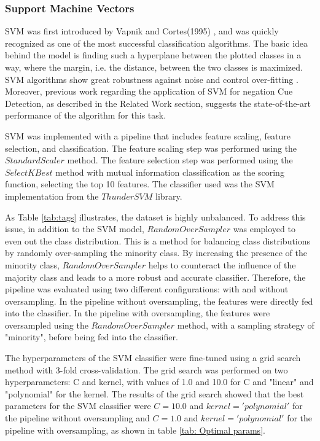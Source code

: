 
\subsubsection{Support Machine Vectors}
 SVM was first introduced by Vapnik and Cortes(1995) \cite{vapnik1995}, and was quickly recognized as one of the most successful classification algorithms. The basic idea behind the model is finding such a hyperplane between the plotted classes in a way, where the margin, i.e. the distance, between the two classes is maximized. SVM algorithms show great robustness against noise and control over-fitting \cite{robust2009}. Moreover, previous work regarding the application of SVM for negation Cue Detection, as described in the Related Work section, suggests the state-of-the-art performance of the algorithm for this task. 

SVM was implemented with a pipeline that includes feature scaling, feature selection, and classification. The feature scaling step was performed using the $StandardScaler$ method. The feature selection step was performed using the $SelectKBest$ method with mutual information classification as the scoring function, selecting the top 10 features. The classifier used was the SVM implementation from the $ThunderSVM$ library\cite{thundersvm}.

As Table \ref{tab:tags} illustrates, the dataset is highly unbalanced. To address this issue, in addition to the SVM model, $RandomOverSampler$ was employed to even out the class distribution. This is a method for balancing class distributions by randomly over-sampling the minority class. By increasing the presence of the minority class, $RandomOverSampler$ helps to counteract the influence of the majority class and leads to a more robust and accurate classifier. Therefore, the pipeline was evaluated using two different configurations: with and without oversampling. In the pipeline without oversampling, the features were directly fed into the classifier. In the pipeline with oversampling, the features were oversampled using the $RandomOverSampler$ method, with a sampling strategy of "minority", before being fed into the classifier.

The hyperparameters of the SVM classifier were fine-tuned using a grid search method with 3-fold cross-validation. The grid search was performed on two hyperparameters: C and kernel, with values of 1.0 and 10.0 for C and "linear" and "polynomial" for the kernel. The results of the grid search showed that the best parameters for the SVM classifier were $C=10.0$ and $kernel='polynomial'$ for the pipeline without oversampling and $C=1.0$ and $kernel='polynomial'$ for the pipeline with oversampling, as shown in table \ref{tab: Optimal params}.

